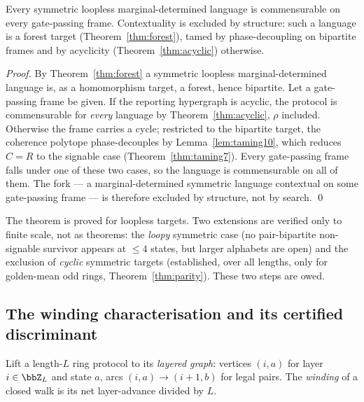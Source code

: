 \begin{theorem}\label{thm:cl}
Every symmetric loopless marginal-determined language is commensurable on every
gate-passing frame. Contextuality is excluded by structure: such a language is a
forest target (Theorem~\ref{thm:forest}), tamed by phase-decoupling on bipartite
frames and by acyclicity (Theorem~\ref{thm:acyclic}) otherwise.
\end{theorem}

\begin{proof}
By Theorem~\ref{thm:forest} a symmetric loopless marginal-determined language is,
as a homomorphism target, a forest, hence bipartite. Let a gate-passing frame be
given. If the reporting hypergraph is acyclic, the protocol is commensurable for
\emph{every} language by Theorem~\ref{thm:acyclic}, $\rho$ included. Otherwise the
frame carries a cycle; restricted to the bipartite target, the coherence polytope
phase-decouples by Lemma~\ref{lem:taming10}, which reduces $C=R$ to the signable
case (Theorem~\ref{thm:taming7}). Every gate-passing frame falls under one of
these two cases, so the language is commensurable on all of them. The fork ---
a marginal-determined symmetric language contextual on some gate-passing frame ---
is therefore excluded by structure, not by search. \qed
\end{proof}

\begin{remark}\label{rem:cl-boundary}
The theorem is proved for loopless targets. Two extensions are verified only to
finite scale, not as theorems: the \emph{loopy} symmetric case (no
pair-bipartite non-signable survivor appears at $\le4$ states, but larger
alphabets are open) and the exclusion of \emph{cyclic} symmetric targets
(established, over all lengths, only for golden-mean odd rings,
Theorem~\ref{thm:parity}). These two steps are owed.
\end{remark}


\subsection{The winding characterisation and its certified discriminant}\label{sub:winding}

Lift a length-$L$ ring protocol to its \emph{layered graph}: vertices $(i,a)$ for
layer $i\in\bbZ_L$ and state $a$, arcs $(i,a)\to(i{+}1,b)$ for legal pairs. The
\emph{winding} of a closed walk is its net layer-advance divided by $L$.

